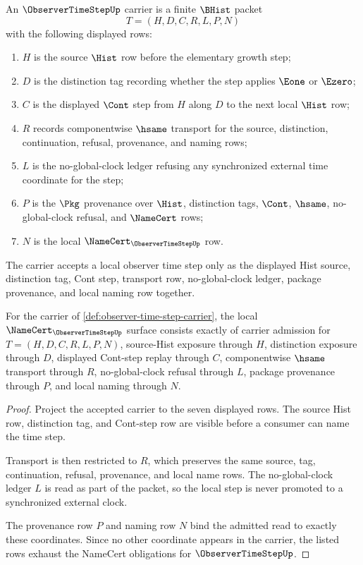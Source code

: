 \begin{definition}
\label{def:observer-time-step-carrier}
An $\ObserverTimeStepUp$ carrier is a finite $\BHist$ packet
$$
T=(H,D,C,R,L,P,N)
$$
with the following displayed rows:
\begin{enumerate}
\item $H$ is the source $\Hist$ row before the elementary growth step;
\item $D$ is the distinction tag recording whether the step applies $\Eone$ or $\Ezero$;
\item $C$ is the displayed $\Cont$ step from $H$ along $D$ to the next local $\Hist$ row;
\item $R$ records componentwise $\hsame$ transport for the source, distinction, continuation, refusal, provenance, and naming rows;
\item $L$ is the no-global-clock ledger refusing any synchronized external time coordinate for the step;
\item $P$ is the $\Pkg$ provenance over $\Hist$, distinction tags, $\Cont$, $\hsame$, no-global-clock refusal, and $\NameCert$ rows;
\item $N$ is the local $\NameCert_{\ObserverTimeStepUp}$ row.
\end{enumerate}
The carrier accepts a local observer time step only as the displayed Hist source, distinction tag, Cont step, transport row, no-global-clock ledger, package provenance, and local naming row together.
\end{definition}

\begin{theorem}
\label{thm:observer-time-step-namecert-obligations}
For the carrier of \autoref{def:observer-time-step-carrier}, the local $\NameCert_{\ObserverTimeStepUp}$ surface consists exactly of carrier admission for $T=(H,D,C,R,L,P,N)$, source-Hist exposure through $H$, distinction exposure through $D$, displayed Cont-step replay through $C$, componentwise $\hsame$ transport through $R$, no-global-clock refusal through $L$, package provenance through $P$, and local naming through $N$.
\end{theorem}
\begin{proof}
Project the accepted carrier to the seven displayed rows. The source Hist row, distinction tag, and Cont-step row are visible before a consumer can name the time step.

Transport is then restricted to $R$, which preserves the same source, tag, continuation, refusal, provenance, and local name rows. The no-global-clock ledger $L$ is read as part of the packet, so the local step is never promoted to a synchronized external clock.

The provenance row $P$ and naming row $N$ bind the admitted read to exactly these coordinates. Since no other coordinate appears in the carrier, the listed rows exhaust the NameCert obligations for $\ObserverTimeStepUp$.
\end{proof}

